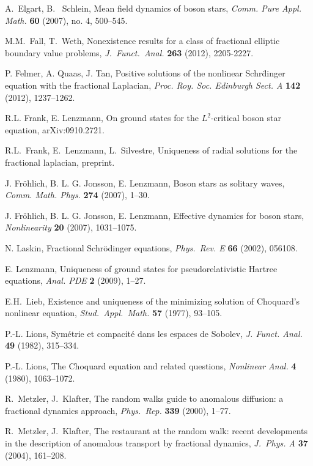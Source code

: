 \documentclass[10pt]{amsart}
\numberwithin{equation}{section}
\begin{document}
\begin{thebibliography}{99}
A.\ Elgart, B. \ Schlein, 
Mean field dynamics of boson stars, 
\emph{Comm. Pure Appl. Math.} \textbf{60} (2007), no. 4, 500--545.

{\sc M.M.\ Fall, T.\ Weth}, Nonexistence results for a 
class of fractional elliptic boundary value problems, {\em J.\ Funct.\ Anal.}
{\bf 263} (2012), 2205-2227.

P. Felmer, A. Quaas, J. Tan, 
Positive solutions of the nonlinear Schr\"dinger equation with the fractional Laplacian, 
{\em Proc. Roy. Soc. Edinburgh Sect. A} {\bf 142} (2012), 1237--1262.

R.L. Frank, E. Lenzmann,
On ground states for the $L^2$-critical boson star equation, arXiv:0910.2721.

R.L.\ Frank, E.\ Lenzmann, L.\ Silvestre, 
Uniqueness of radial solutions for the fractional laplacian, preprint.

J. Fr\"ohlich, B. L. G. Jonsson, E. Lenzmann,
Boson stars as solitary waves,
\emph{Comm. Math. Phys. } \textbf{274} (2007), 
1--30.

J. Fr\"ohlich, B. L. G. Jonsson, E. Lenzmann,
Effective dynamics for boson stars,
\emph{ Nonlinearity}  \textbf{20} (2007), 
1031--1075. 

N. Laskin, Fractional Schr\"odinger equations,
{\em Phys.\ Rev. E} {\bf 66} (2002), 056108.

E. Lenzmann, Uniqueness of ground states for pseudorelativistic Hartree equations,
{\em Anal. PDE} {\bf 2} (2009), 1--27.
 
 E.H.\ Lieb,
 Existence and uniqueness of the minimizing solution of Choquard's nonlinear equation, 
 {\em Stud.\ Appl.\ Math.} {\bf 57} (1977), 93--105. 
 

 P.-L. Lions, 
 Sym\'etrie et compacit\'e dans les espaces de Sobolev, 
 {\em J. Funct. Anal.} {\bf 49} (1982), 315--334. 
 
  P.-L. Lions, 
 The Choquard equation and related questions,
{\em Nonlinear Anal.} {\bf 4} (1980), 1063--1072.
 

R.\ Metzler, J.\ Klafter,
The random walks guide to anomalous diffusion: a fractional dynamics approach, 
{\em Phys.\ Rep.} {\bf 339} (2000), 1--77.

R.\ Metzler, J.\ Klafter,
The restaurant at the random walk: recent developments in the description of anomalous
transport by fractional dynamics, 
{\em J.\ Phys. A} {\bf 37} (2004), 161--208.


\end{thebibliography}
\end{document}
